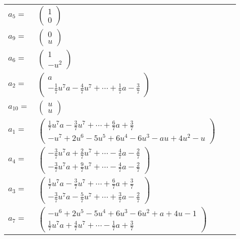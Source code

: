\documentclass[1p]{elsarticle_modified}
\theoremstyle{definition}
\begin{document}
\begin{tabular}{m{7pt} m{180pt} m{7pt} m{180pt} }
\flushright $a_{5}=$&$\begin{pmatrix}1\\0\end{pmatrix}$ \\
\flushright $a_{9}=$&$\begin{pmatrix}0\\u\end{pmatrix}$ \\
\flushright $a_{6}=$&$\begin{pmatrix}1\\- u^2\end{pmatrix}$ \\
\flushright $a_{2}=$&$\begin{pmatrix}a\\-\frac{1}{7} u^7 a-\frac{4}{7} u^7+\cdots+\frac{1}{7} a-\frac{3}{7}\end{pmatrix}$ \\
\flushright $a_{10}=$&$\begin{pmatrix}u\\u\end{pmatrix}$ \\
\flushright $a_{1}=$&$\begin{pmatrix}\frac{1}{7} u^7 a-\frac{3}{7} u^7+\cdots+\frac{6}{7} a+\frac{3}{7}\\- u^7+2 u^6-5 u^5+6 u^4-6 u^3- a u+4 u^2- u\end{pmatrix}$ \\
\flushright $a_{4}=$&$\begin{pmatrix}-\frac{3}{7} u^7 a+\frac{2}{7} u^7+\cdots-\frac{4}{7} a-\frac{2}{7}\\-\frac{3}{7} u^7 a+\frac{9}{7} u^7+\cdots-\frac{4}{7} a-\frac{2}{7}\end{pmatrix}$ \\
\flushright $a_{3}=$&$\begin{pmatrix}\frac{1}{7} u^7 a-\frac{3}{7} u^7+\cdots+\frac{6}{7} a+\frac{3}{7}\\-\frac{3}{7} u^7 a-\frac{5}{7} u^7+\cdots+\frac{3}{7} a-\frac{2}{7}\end{pmatrix}$ \\
\flushright $a_{7}=$&$\begin{pmatrix}- u^6+2 u^5-5 u^4+6 u^3-6 u^2+a+4 u-1\\\frac{1}{7} u^7 a+\frac{4}{7} u^7+\cdots-\frac{1}{7} a+\frac{3}{7}\end{pmatrix}$ \\

\end{tabular}
\end{document}
